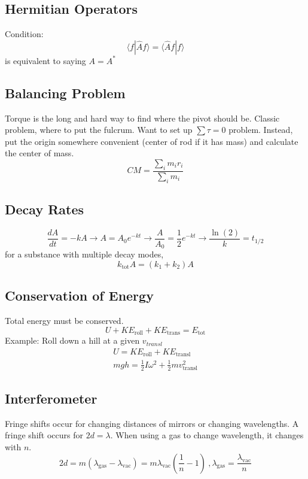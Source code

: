 \documentclass[10pt,letter]{article}
\begin{document}
\subsection{Hermitian Operators}
Condition:
\begin{equation}
 \langle f | \hat{A} f\rangle = \langle \hat{A} f | f \rangle 
\end{equation}
 is equivalent to saying $A=A^*$

\subsection{Balancing Problem}
Torque is the long and hard way to find where the pivot should be. Classic problem, where to put the fulcrum. Want to set up $\sum \tau = 0$ problem. Instead, put the origin somewhere convenient (center of rod if it has mass) and calculate the center of mass.
\begin{equation}
 CM = \frac{\sum \limits_i m_i r_i}{\sum \limits_i m_i} 
\end{equation}

\subsection{Decay Rates}
\begin{equation}
 \frac{dA}{dt} = -kA \rightarrow A = A_0 e^{-kt} \rightarrow \frac{A}{A_0} = \frac{1}{2}e^{-kt} \rightarrow \frac{\ln(2)}{k} = t_{1/2}
\end{equation}
for a substance with multiple decay modes,
\begin{equation}
 k_{\textrm{tot}} A = (k_1 + k_2)A 
\end{equation}

\subsection{Conservation of Energy}
Total energy must be conserved.
\begin{equation}
 U + KE_{\textrm{roll}} + KE_{\textrm{trans}} = E_{\textrm{tot}} 
\end{equation}
Example: Roll down a hill at a given $v_{transl}$
\begin{align}
 U = KE_{\textrm{roll}} + KE_{\textrm{transl}}\\
mgh = \frac{1}{2}I\omega^2 + \frac{1}{2}mv_{\textrm{transl}}^2
\end{align}

\subsection{Interferometer}
Fringe shifts occur for changing distances of mirrors or changing wavelengths. A fringe shift occurs for $2d=\lambda$. When using a gas to change wavelength, it changes with $n$.
\begin{equation}
 2d = m(\lambda_{\textrm{gas}} - \lambda_{\textrm{vac}}) = m\lambda_{\textrm{vac}}\left( \frac{1}{n} - 1\right)~,\lambda_{\textrm{gas}} = \frac{\lambda_{\textrm{vac}}}{n}
\end{equation}
\end{document}
